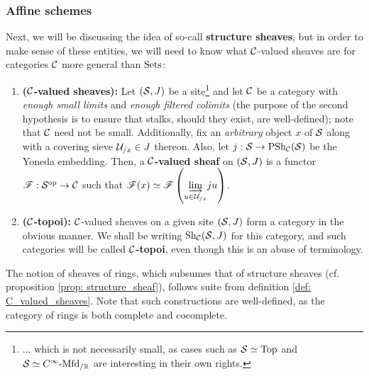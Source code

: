         \subsubsection{Affine schemes}
            Next, we will be discussing the idea of so-call \textbf{structure sheaves}, but in order to make sense of these entities, we will need to know what $\C$-valued sheaves are for categories $\C$ more general than $\Sets$:
            \begin{definition} \label{def: C_valued_sheaves}
                \noindent
                \begin{enumerate}
                    \item \textbf{($\C$-valued sheaves):} Let $(\S, J)$ be a site\footnote{... which is not necessarily small, as cases such as $\S \cong \Top$ and $\S \cong C^{\infty}\-\Mfd_{/\R}$ are interesting in their own rights.} and let $\C$ be a category with \textit{enough small limits} and \textit{enough filtered colimits} (the purpose of the second hypothesis is to ensure that stalks, should they exist, are well-defined); note that $\C$ need not be small. Additionally, fix an \textit{arbitrary} object $x$ of $\S$ along with a covering sieve $\calU_{/x} \in J$ thereon. Also, let $j: \S \to \Psh_{\C}(\S)$ be the Yoneda embedding. Then, a \textbf{$\C$-valued sheaf} on $(\S, J)$ is a functor $\scrF: \S^{\op} \to \C$ such that $\scrF(x) \cong \scrF\left( \underset{u \in \calU_{/x}}{\indlim} ju \right)$.
                    \item \textbf{($\C$-topoi):} $\C$-valued sheaves on a given site $(\S, J)$ form a category in the obvious manner. We shall be writing $\Sh_{\C}(\S, J)$ for this category, and such categories will be called \textbf{$\C$-topoi}, even though this is an abuse of terminology.
                \end{enumerate}
            \end{definition}
            \begin{example}
                The notion of sheaves of rings, which subsumes that of structure sheaves (cf. proposition \ref{prop: structure_sheaf}), follows suite from definition \ref{def: C_valued_sheaves}. Note that such constructions are well-defined, as the category of rings is both complete and cocomplete.
            \end{example}
            

